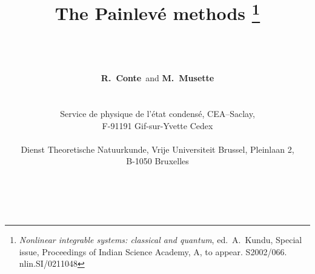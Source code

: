 \documentclass[10pt]{article}
\begin{document}
\def\today{27~November~2002}
\def \Oeuvres{O$\!$euvres}
\def \Lecons{Le\c cons}
\def \ie {i.e.~}
\def \LHS{l.h.s.~}
\def \formerDT{Darboux involution}
\def\CRAS{C.~R.~Acad.~Sc.~Paris}
\def\SAM{Stud.~Appl.~Math.~}
\def\AnnENS{Ann.~\'Ec.~Norm.~}
\def\Pn     {{\rm Pn}}
\def\PI     {{\rm P1}}
\def\PII    {{\rm P2}}
\def\PIII   {{\rm P3}}
\def\PIV    {{\rm P4}}
\def\PV     {{\rm P5}}
\def\PVI    {{\rm P6}}

\def\pasq{q} %
\def\pas{h}  %

\def\Alpha{A}
\def\Beta {B}
\def\abcd{\alpha,\beta,\gamma,\delta}

\def \ccomma{\raise 2pt\hbox{,}} %
\def \D {\hbox{d}}
\def \Log {\mathop{\rm Log}\nolimits}
\def \sinh{\mathop{\rm sinh}\nolimits}
\def \sech{\mathop{\rm sech}\nolimits}
\def \grad{\mathop{\rm grad}\nolimits}
\def \mod#1{\vert #1 \vert}
\def \bfE {{    E}}
\def \bfR {{    R}}
\def \bfp {{    p}}
\def \bfu {{    u}}

\title{
\textbf{The Painlev\'e methods}
\footnote{ \textit{Nonlinear integrable systems: classical and quantum},
ed.~A.~Kundu, 
Special issue, Proceedings of Indian Science Academy, A, to appear. 
S2002/066. nlin.SI/0211048} }

\author{
\\
\\
\\
{\bf R.~Conte}\dag \  and {\bf M.~Musette}\ddag
\\
\\
\\
\noindent
\dag Service de physique de l'\'etat condens\'e,
CEA--Saclay,
\\
\noindent
F-91191 Gif-sur-Yvette Cedex
\\
\\
\noindent
\ddag Dienst Theoretische Natuurkunde,
Vrije Universiteit Brussel,
Pleinlaan 2,
\\
\noindent
B-1050 Bruxelles
\\
\\
\\
}
\end{document}
